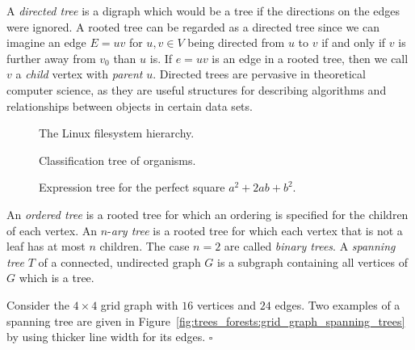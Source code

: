 A \emph{directed tree} is a digraph which would
be a tree if the directions on the edges were ignored. A rooted tree
can be regarded as a directed tree since we can imagine an edge
$E = uv$ for $u,v \in V$ being directed from $u$ to $v$ if and only
if $v$ is further away from $v_0$ than $u$ is. If $e = uv$ is an edge
in a rooted tree, then we call $v$ a \emph{child} vertex
with \emph{parent} $u$. Directed trees are pervasive in
theoretical computer science, as they are useful structures for
describing algorithms and relationships between objects in certain
data sets.

\begin{figure}[!htbp]
\centering
{}

\caption{The Linux filesystem hierarchy.}
\label{fig:trees_forests:filesystem_hierarchy}
\end{figure}

\begin{figure}[!htbp]
\centering
{}

\caption{Classification tree of organisms.}
\label{fig:trees_forests:classification_tree_organisms}
\end{figure}

\begin{figure}[!htbp]
\centering
{}

\caption{Expression tree for the perfect square $a^2 + 2ab + b^2$.}
\label{fig:trees_forests:expression_tree_perfect_square}
\end{figure}

An \emph{ordered tree} is a rooted tree for which
an ordering is specified for the children of each vertex. An
$n$-\emph{ary tree} is a rooted tree for which
each vertex that is not a leaf has at most $n$ children. The case
$n = 2$ are called \emph{binary trees}. A
\emph{spanning tree} $T$ of a connected,
undirected graph $G$ is a subgraph containing all vertices of $G$
which is a tree.

\begin{example}
\label{eg:trees_forests:spanning_tree}
{\rm
Consider the $4 \times 4$ grid graph with $16$ vertices and
$24$ edges. Two examples of a spanning tree are given in
Figure~\ref{fig:trees_forests:grid_graph_spanning_trees} by using
thicker line width for its edges.}
\hfill $\square$
\end{example}

